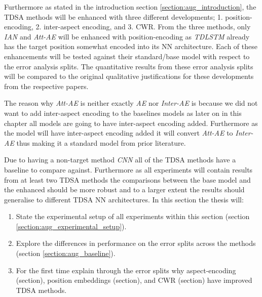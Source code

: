 Furthermore as stated in the introduction section \ref{section:aug_introduction}, the TDSA methods will be enhanced with three different developments; 1. position-encoding, 2. inter-aspect encoding, and 3. CWR. From the three methods, only \textit{IAN} and \textit{Att-AE} will be enhanced with position-encoding as \textit{TDLSTM} already has the target position somewhat encoded into its NN architecture. Each of these enhancements will be tested against their standard/base model with respect to the error analysis splits. The quantitative results from these error analysis splits will be compared to the original qualitative justifications for these developments from the respective papers.

The reason why \textit{Att-AE} is neither exactly \textit{AE} \citep{wang-etal-2016-attention} nor \textit{Inter-AE} \citep{hazarika-etal-2018-modeling} is because we did not want to add inter-aspect encoding to the baselines models as later on in this chapter all models are going to have inter-aspect encoding added. Furthermore as the model will have inter-aspect encoding added it will convert \textit{Att-AE} to \textit{Inter-AE} thus making it a standard model from prior literature.

Due to having a non-target method \textit{CNN} all of the TDSA methods have a baseline to compare against. Furthermore as all experiments will contain results from at least two TDSA methods the comparisons between the base model and the enhanced should be more robust and to a larger extent the results should generalise to different TDSA NN architectures. In this section the thesis will:
\begin{enumerate}
    \item State the experimental setup of all experiments within this section (section \ref{section:aug_experimental_setup}).
    \item Explore the differences in performance on the error splits across the methods (section \ref{section:aug_baseline}).
    \item For the first time explain through the error splits why aspect-encoding (section), position embeddings (section), and CWR (section) have improved TDSA methods.
\end{enumerate}

